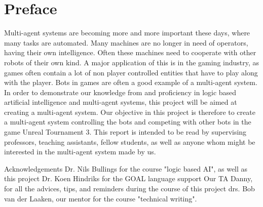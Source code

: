 \chapter*{Preface}
Multi-agent systems are becoming more and more important these days, where many tasks are automated. Many machines are no longer in need of operators, having their own intelligence. Often these machines need to cooperate with other robots of their own kind. A major application of this is in the gaming industry, as games often contain a lot of non player controlled entities that have to play along with the player. Bots in games are often a good example of a multi-agent system.
    In order to demonstrate our knowledge from and proficiency in logic based artificial intelligence and multi-agent systems, this project will be aimed at creating a multi-agent system. Our objective in this project is therefore to create a multi-agent system controlling the bots and competing with other bots in the game Unreal Tournament 3. 
    This report is intended to be read by supervising professors, teaching assistants, fellow students, as well as anyone whom might be interested in the multi-agent system made by us.

Acknowledgements
    Dr. Nils Bullings for the course "logic based AI", as well as this project
    Dr. Koen Hindriks for the GOAL language support
    Our TA Danny, for all the advices, tips, and reminders during the course of this project
    drs. Bob van der Laaken, our mentor for the course "technical writing". 